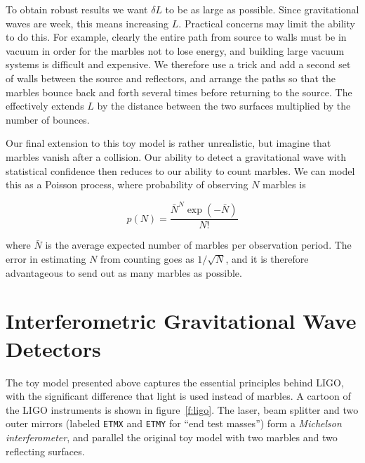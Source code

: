 To obtain robust results we want $\delta L$ to be as large as
possible.  Since gravitational waves are week, this means increasing
$L$.  Practical concerns may limit the ability to do this.  For
example, clearly the entire path from source to walls must be in
vacuum in order for the marbles not to lose energy, and building large
vacuum systems is difficult and expensive.  We therefore use a trick
and add a second set of walls between the source and reflectors, and
arrange the paths so that the marbles bounce back and forth several
times before returning to the source.  The effectively extends $L$ by
the distance between the two surfaces multiplied by the number of
bounces.

Our final extension to this toy model is rather unrealistic, but
imagine that marbles vanish after a collision.  Our ability to detect a
gravitational wave with statistical confidence then reduces to our
ability to count marbles.  We can model this as a Poisson process, where
probability of observing $N$ marbles is 

\begin{equation*}
p(N) = \frac{\bar{N}^N \exp(-\bar{N})} {N!}
\end{equation*}

where $\bar{N}$ is the average expected number of marbles per
observation period.  The error in estimating $N$ from counting goes as
$1/\sqrt{N}$, and it is therefore advantageous to send out as many 
marbles as possible.

\section{Interferometric Gravitational Wave Detectors}

The toy model presented above captures the essential principles behind
LIGO, with the significant difference that light is used instead of
marbles.  A cartoon of the LIGO instruments is shown in
figure~\ref{f:ligo}.  The laser, beam splitter and two outer mirrors
(labeled \texttt{ETMX} and \texttt{ETMY} for ``end test masses'') form
a \emph{Michelson interferometer}, and parallel the original toy model
with two marbles and two reflecting surfaces.



